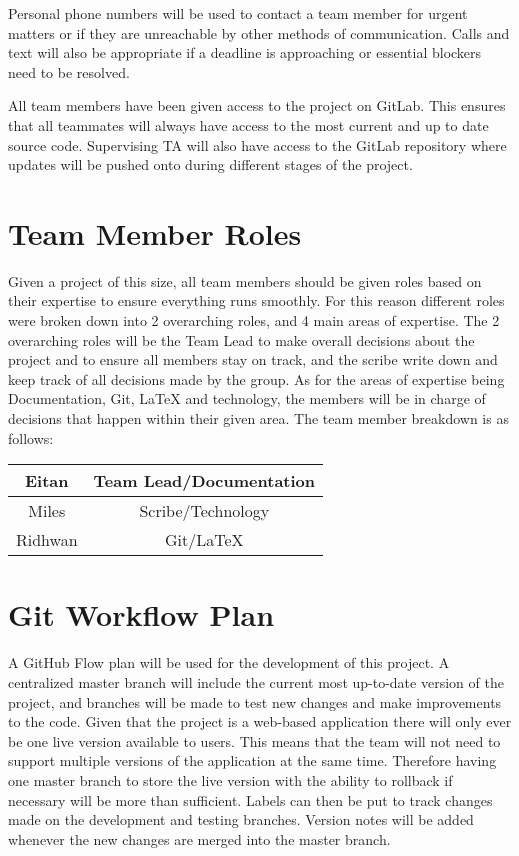 \documentclass{article}
\begin{document}
Personal phone numbers will be used to contact a team member for urgent matters or if they are unreachable by other methods of communication. Calls and text will also be appropriate if a deadline is approaching or essential blockers need to be resolved.

All team members have been given access to the project on GitLab. This ensures that all
teammates will always have access to the most current and up to date source code. Supervising TA will also have access to the GitLab repository where updates will be pushed onto during different stages of the project.

\section{Team Member Roles}

Given a project of this size, all team members should be given roles based on their expertise
to ensure everything runs smoothly. For this reason different roles were broken down into 2 overarching roles, and 4 main
areas of expertise. The 2 overarching roles will be the Team Lead to make overall decisions about the project and to ensure
all members stay on track, and the scribe write down and keep track of all decisions made by the group. As for the areas of expertise 
being Documentation, Git, LaTeX and technology, the members will be in charge of decisions that happen within their given area.
The team member breakdown is as follows:

\begin{center}
  \begin{tabular}{ |c|c| }
    \hline
    Eitan & Team Lead/Documentation \\
    \hline
    Miles & Scribe/Technology\\
    \hline
    Ridhwan & Git/LaTeX\\
    \hline
  \end{tabular}
\end{center}



\section{Git Workflow Plan}

A GitHub Flow plan will be used for the development of this project. A centralized master branch will include the current most up-to-date version of the project, and branches will be made to test new changes and make improvements to the code. Given that the project is a web-based application there will only ever be one live version available to users. This means that the team will not need to support multiple versions of the application at the same time. Therefore having one master branch to store the live version with the ability to rollback if necessary will be more than sufficient. Labels can then be put to track changes made on the development and testing branches. Version notes will be added whenever the new changes are merged into the master branch.
\end{document}
